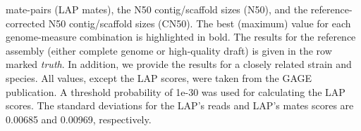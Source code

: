 \documentclass[12pt,\mydriver]{thesis}
\begin{document}
\begin{landscape}
\begin{table}[tb!]
{mate-pairs (LAP mates), the N50 contig/scaffold sizes (N50),
and the reference-corrected N50 contig/scaffold sizes (CN50).
The best (maximum) value for each
genome-measure combination is highlighted in bold.
The results for the reference
assembly (either complete genome or high-quality draft) is given in the row
marked \emph{truth}.  In addition, we
provide the results for a closely related strain and species.
All values, except the LAP scores, were taken from the
GAGE publication. A threshold probability of 1e-30 was used for calculating the LAP scores. The standard deviations for the LAP's reads and LAP's mates scores are 0.00685 and 0.00969, respectively.}
\label{tab:rhodobacter}
\end{table}
\renewcommand{\baselinestretch}{2}
\small\normalsize
\end{landscape}
\end{document}
